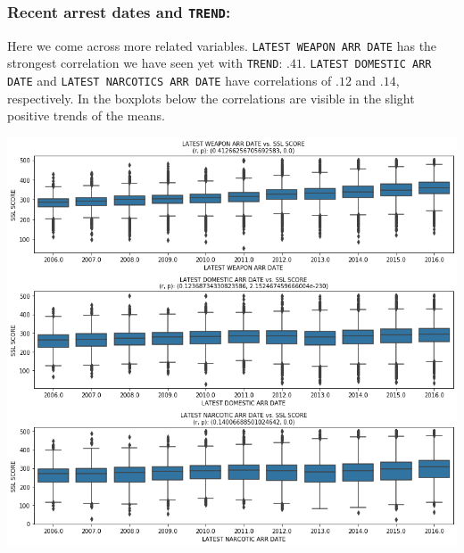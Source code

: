 \subsubsection{Recent arrest dates and \texttt{TREND}:}
Here we come across more related variables. \texttt{LATEST WEAPON ARR DATE} has the strongest correlation we have seen yet with \texttt{TREND}: $.41$. \texttt{LATEST DOMESTIC ARR DATE} and \texttt{LATEST NARCOTICS ARR DATE} have correlations of $.12$ and $.14$, respectively. In the boxplots below the correlations are visible in the slight positive trends of the means.
\begin{center}
    \includegraphics[scale=.4]{images/latest_arrests.png}
\end{center}

